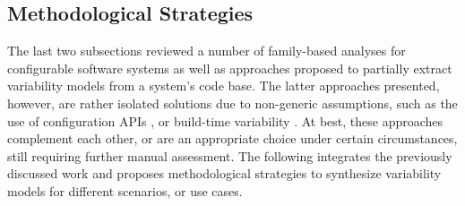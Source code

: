   

\subsection{Methodological Strategies}
The last two subsections reviewed a number of family-based analyses for
configurable software systems as well as approaches proposed to partially
extract variability models from a system’s code base. The latter approaches
presented, however, are rather isolated solutions due to non-generic
assumptions, such as the use of configuration APIs \citep{rabkin_static_2011},
or build-time variability \citep{nadi_where_2015}. At best, these approaches
complement each other, or are an appropriate choice under certain
circumstances, still requiring further manual assessment. The following
integrates the previously discussed work and proposes methodological strategies
to synthesize variability models for different scenarios, or use cases.

